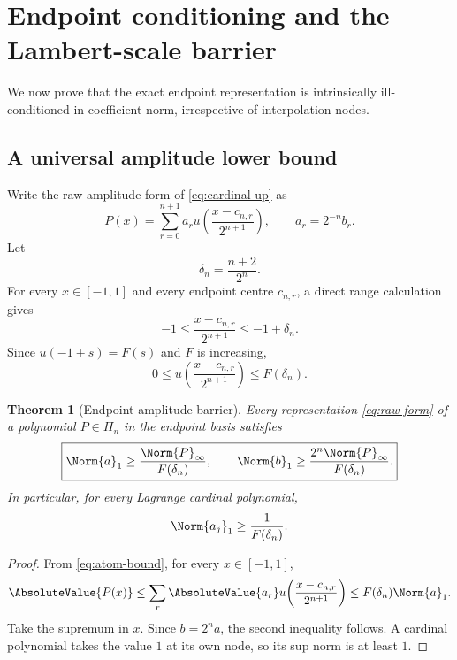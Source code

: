 \documentclass[11pt,oneside]{article}
\newtheorem{theorem}{Theorem}[section]
\theoremstyle{definition}
\theoremstyle{remark}
\newcommand{\1}{\mathbf{1}}
\begin{document}
\section{Endpoint conditioning and the Lambert-scale barrier}
\label{sec:conditioning}

We now prove that the exact endpoint representation is intrinsically
ill-conditioned in coefficient norm, irrespective of interpolation nodes.

\subsection{A universal amplitude lower bound}

Write the raw-amplitude form of \eqref{eq:cardinal-up} as
\begin{equation}
 P(x)=\sum_{r=0}^{n+1}a_r
 u\!\left(\frac{x-c_{n,r}}{2^{n+1}}\right),
 \qquad a_r=2^{-n}b_r.
 \label{eq:raw-form}
\end{equation}
Let
\begin{equation}
 \delta_n=\frac{n+2}{2^n}.
 \label{eq:delta}
\end{equation}
For every $x\in[-1,1]$ and every endpoint centre $c_{n,r}$, a direct range
calculation gives
\begin{equation}
 -1\le\frac{x-c_{n,r}}{2^{n+1}}\le-1+\delta_n.
 \label{eq:argument-range}
\end{equation}
Since $u(-1+s)=F(s)$ and $F$ is increasing,
\begin{equation}
 0\le u\!\left(\frac{x-c_{n,r}}{2^{n+1}}\right)
 \le F(\delta_n).
 \label{eq:atom-bound}
\end{equation}

\begin{theorem}[Endpoint amplitude barrier]
\label{thm:amplitude-barrier}
Every representation \eqref{eq:raw-form} of a polynomial $P\in\Pi_n$ in
the endpoint basis satisfies
\begin{equation}
 \boxed{
 \Norm{a}_1\ge\frac{\Norm{P}_\infty}{F(\delta_n)},
 \qquad
 \Norm{b}_1\ge\frac{2^n\Norm{P}_\infty}{F(\delta_n)}.}
 \label{eq:amplitude-bound}
\end{equation}
In particular, for every Lagrange cardinal polynomial,
\begin{equation}
 \Norm{a_j}_1\ge\frac1{F(\delta_n)}.
 \label{eq:cardinal-lower}
\end{equation}
\end{theorem}

\begin{proof}
From \eqref{eq:atom-bound}, for every $x\in[-1,1]$,
\[
 \AbsoluteValue{P(x)}
 \le\sum_r\AbsoluteValue{a_r}
 u\!\left(\frac{x-c_{n,r}}{2^{n+1}}\right)
 \le F(\delta_n)\Norm{a}_1.
\]
Take the supremum in $x$.  Since $b=2^na$, the second inequality follows.
A cardinal polynomial takes the value $1$ at its own node, so its sup norm is
at least $1$.
\end{proof}
\end{document}
